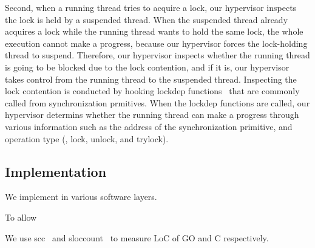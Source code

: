 Second, when a running thread tries to acquire a lock, our hypervisor
inspects the lock is held by a suspended thread.
%
When the suspended thread already acquires a lock while the running
thread wants to hold the same lock, the whole execution cannot make a
progress, because our hypervisor forces the lock-holding thread to
suspend.
%
Therefore, our hypervisor inspects whether the running thread is going
to be blocked due to the lock contention, and if it is, our hypervisor
takes control from the running thread to the suspended thread.
%
Inspecting the lock contention is conducted by hooking lockdep
functions~\cite{lockdep} that are commonly called from synchronization
prmitives.
%
When the lockdep functions are called, our hypervisor determins
whether the running thread can make a progress through various
information such as the address of the synchronization primitive, and
operation type (\ie, lock, unlock, and trylock).


\subsection{Implementation}
\label{ss:impl}

We implement \sys in various software layers.
%

%
To allow 


We use scc~\cite{scc} and sloccount~\cite{sloccount} to measure LoC of
GO and C respectively.


